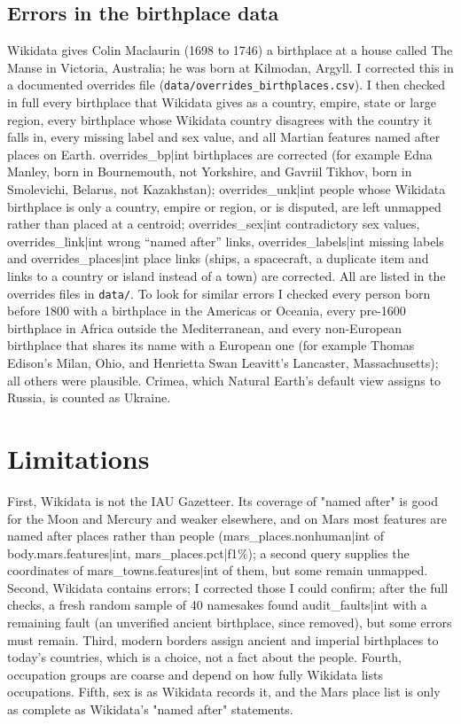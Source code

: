 \documentclass[11pt,a4paper]{article}
\begin{document}
\subsection{Errors in the birthplace data}\label{sec:errors}
Wikidata gives Colin Maclaurin (1698 to 1746) a birthplace at a house called The Manse in Victoria, Australia; he was born at Kilmodan, Argyll. I corrected this in a documented overrides file (\texttt{data/overrides\_birthplaces.csv}). I then checked in full every birthplace that Wikidata gives as a country, empire, state or large region, every birthplace whose Wikidata country disagrees with the country it falls in, every missing label and sex value, and all Martian features named after places on Earth. {{overrides_bp|int}} birthplaces are corrected (for example Edna Manley, born in Bournemouth, not Yorkshire, and Gavriil Tikhov, born in Smolevichi, Belarus, not Kazakhstan); {{overrides_unk|int}} people whose Wikidata birthplace is only a country, empire or region, or is disputed, are left unmapped rather than placed at a centroid; {{overrides_sex|int}} contradictory sex values, {{overrides_link|int}} wrong ``named after'' links, {{overrides_labels|int}} missing labels and {{overrides_places|int}} place links (ships, a spacecraft, a duplicate item and links to a country or island instead of a town) are corrected. All are listed in the overrides files in \texttt{data/}. To look for similar errors I checked every person born before 1800 with a birthplace in the Americas or Oceania, every pre-1600 birthplace in Africa outside the Mediterranean, and every non-European birthplace that shares its name with a European one (for example Thomas Edison's Milan, Ohio, and Henrietta Swan Leavitt's Lancaster, Massachusetts); all others were plausible. Crimea, which Natural Earth's default view assigns to Russia, is counted as Ukraine.

\section{Limitations}
First, Wikidata is not the IAU Gazetteer. Its coverage of "named after" is good for the Moon and Mercury and weaker elsewhere, and on Mars most features are named after places rather than people ({{mars_places.nonhuman|int}} of {{body.mars.features|int}}, {{mars_places.pct|f1}}\%); a second query supplies the coordinates of {{mars_towns.features|int}} of them, but some remain unmapped. Second, Wikidata contains errors; I corrected those I could confirm; after the full checks, a fresh random sample of 40 namesakes found {{audit_faults|int}} with a remaining fault (an unverified ancient birthplace, since removed), but some errors must remain. Third, modern borders assign ancient and imperial birthplaces to today's countries, which is a choice, not a fact about the people. Fourth, occupation groups are coarse and depend on how fully Wikidata lists occupations. Fifth, sex is as Wikidata records it, and the Mars place list is only as complete as Wikidata's "named after" statements.
\end{document}
